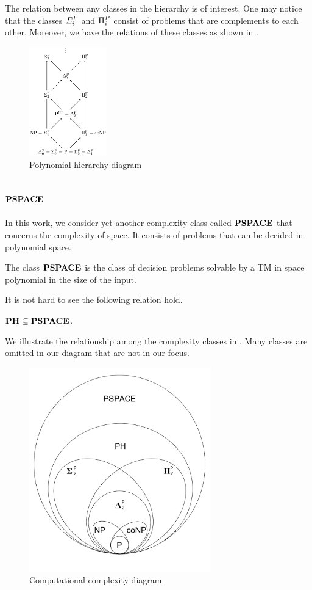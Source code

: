 The relation between any classes in the hierarchy is of interest.
One may notice that the classes $\mathit{\Sigma^P_{i}}$ and $\Pi^P_{i}$ consist
of problems that are complements to each other.
Moreover, we have the relations of these classes as shown in .

\begin{figure}[h!]
  \centering
  \includegraphics[width=0.3\textwidth]{img/ph_diagram.png}
  \caption{Polynomial hierarchy diagram \label{fig:ph_diagram}}
\end{figure}

\subsection{$\textbf{PSPACE}$}
In this work, we consider yet another complexity class called $\textbf{PSPACE}$ that
concerns the complexity of space.
It consists of problems that can be decided in polynomial space.

\begin{definition}
	The class $\textbf{PSPACE}$ is the class of decision problems solvable by a TM
	in space polynomial in the size of the input.
\end{definition}
It is not hard to see the following relation hold.
\begin{center}
	$\textbf{PH} \subseteq \textbf{PSPACE}$.
\end{center}

We illustrate the relationship among the complexity classes in
. Many classes are omitted in our diagram
that are not in our focus.

\begin{figure}[h!]
  \centering
  \includegraphics[width=0.7\textwidth]{img/comp_diagram.pdf}
  \caption{Computational complexity diagram \label{fig:comp_diagram}}
\end{figure}


